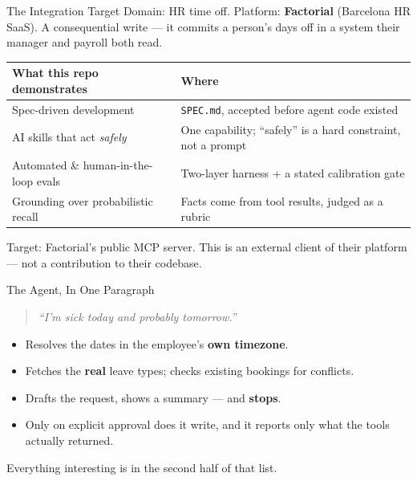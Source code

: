 \documentclass[aspectratio=169]{beamer}
\newcommand{\code}[1]{\texttt{#1}}
\begin{document}
\begin{frame}{The Integration Target}
  Domain: HR time off. Platform: \textbf{Factorial} (Barcelona HR SaaS).
  A consequential write --- it commits a person's days off in a system
  their manager and payroll both read.
  \vspace{0.5em}
  \small
  \begin{tabularx}{\linewidth}{@{}Y Y@{}}
    \toprule
    \textbf{What this repo demonstrates} & \textbf{Where} \\
    \midrule
    Spec-driven development & \code{SPEC.md}, accepted before agent code existed \\
    AI skills that act \textit{safely} & One capability; ``safely'' is a hard constraint, not a prompt \\
    Automated \& human-in-the-loop evals & Two-layer harness + a stated calibration gate \\
    Grounding over probabilistic recall & Facts come from tool results, judged as a rubric \\
    \bottomrule
  \end{tabularx}
  \vspace{0.6em}

  Target: Factorial's public MCP server. This is an external client of
  their platform --- not a contribution to their codebase.
\end{frame}

\begin{frame}{The Agent, In One Paragraph}
  \begin{quote}
    \itshape ``I'm sick today and probably tomorrow.''
  \end{quote}
  \begin{itemize}
    \item Resolves the dates in the employee's \textbf{own timezone}.
    \item Fetches the \textbf{real} leave types; checks existing bookings for conflicts.
    \item Drafts the request, shows a summary --- and \textbf{stops}.
    \item Only on explicit approval does it write, and it reports only what
      the tools actually returned.
  \end{itemize}
  \vspace{0.5em}
  \centering\small\textcolor{mbMuted}{Everything interesting is in the second half of that list.}
\end{frame}
\end{document}
